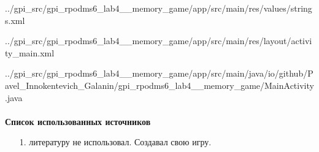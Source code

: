 \documentclass[12pt, a4paper, simple]{eskdtext}
\begin{document}

    \newpage

    
        {../gpi_src/gpi_rpodms6_lab4__memory_game/app/src/main/res/values/strings.xml}

    
        {../gpi_src/gpi_rpodms6_lab4__memory_game/app/src/main/res/layout/activity_main.xml}

    
        {../gpi_src/gpi_rpodms6_lab4__memory_game/app/src/main/java/io/github/Pavel_Innokentevich_Galanin/gpi_rpodms6_lab4__memory_game/MainActivity.java}




    \paragraph{} \textbf{Список использованных источников} 

    \begin{enumerate}
        \item[1.] литературу не использовал. Создавал свою игру.
    \end{enumerate}
\end{document}
